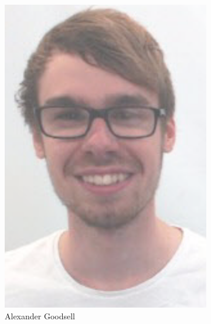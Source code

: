 \chapter{\teamname}\label{group}\label{section \thechapter}
\newpage
\captionsetup[subfigure]{labelformat=empty}

\begin{figure}
    \centering
    \begin{subfigure}[b]{0.45\textwidth}
        \centering
        \includegraphics[height=0.3\textheight]{Files/AG}
        \caption{Alexander Goodsell}
    \end{subfigure}
    ~~~~
    \begin{subfigure}[b]{0.45\textwidth}

\end{subfigure}
\end{figure}
